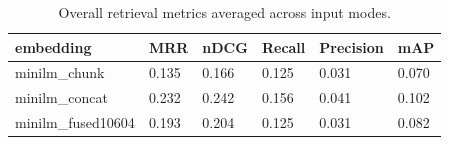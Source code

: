 \begin{table}
\caption{Overall retrieval metrics averaged across input modes.}
\label{tab:overview-metrics}
\begin{tabular}{llllll}
\toprule
embedding & MRR & nDCG & Recall & Precision & mAP \\
\midrule
minilm_chunk & 0.135 & 0.166 & 0.125 & 0.031 & 0.070 \\
minilm_concat & 0.232 & 0.242 & 0.156 & 0.041 & 0.102 \\
minilm_fused10604 & 0.193 & 0.204 & 0.125 & 0.031 & 0.082 \\
\bottomrule
\end{tabular}
\end{table}
